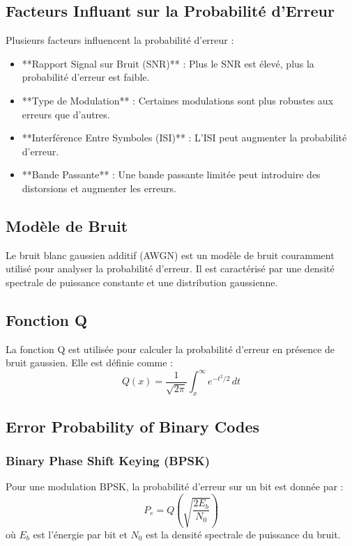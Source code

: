 \documentclass[10pt,a4paper]{article}
\begin{document}
\subsection*{Facteurs Influant sur la Probabilité d'Erreur}
Plusieurs facteurs influencent la probabilité d'erreur :
\begin{itemize}
    \item **Rapport Signal sur Bruit (SNR)** : Plus le SNR est élevé, plus la probabilité d'erreur est faible.
    \item **Type de Modulation** : Certaines modulations sont plus robustes aux erreurs que d'autres.
    \item **Interférence Entre Symboles (ISI)** : L'ISI peut augmenter la probabilité d'erreur.
    \item **Bande Passante** : Une bande passante limitée peut introduire des distorsions et augmenter les erreurs.
\end{itemize}

\subsection*{Modèle de Bruit}
Le bruit blanc gaussien additif (AWGN) est un modèle de bruit couramment utilisé pour analyser la probabilité d'erreur. Il est caractérisé par une densité spectrale de puissance constante et une distribution gaussienne.

\subsection*{Fonction Q}
La fonction Q est utilisée pour calculer la probabilité d'erreur en présence de bruit gaussien. Elle est définie comme :
\[ Q(x) = \frac{1}{\sqrt{2\pi}} \int_{x}^{\infty} e^{-t^2/2} \, dt \]

\subsection*{Error Probability of Binary Codes}

\subsubsection*{Binary Phase Shift Keying (BPSK)}
Pour une modulation BPSK, la probabilité d'erreur sur un bit est donnée par :
\[ P_e = Q\left(\sqrt{\frac{2E_b}{N_0}}\right) \]
où \( E_b \) est l'énergie par bit et \( N_0 \) est la densité spectrale de puissance du bruit.
\end{document}
